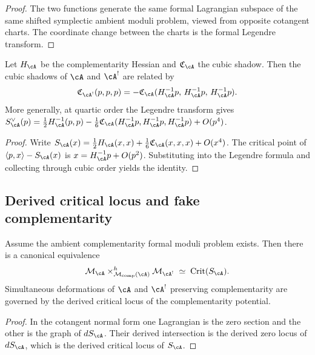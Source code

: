 \begin{proof}
The two functions generate the same formal Lagrangian subspace of
the same shifted symplectic ambient moduli problem, viewed from
opposite cotangent charts. The coordinate change between the charts
is the formal Legendre transform.
\end{proof}

\begin{proposition}
\label{prop:legendre-duality-cubic}
\ClaimStatusProvedHere
Let $H_{\cA}$ be the complementarity Hessian and
$\mathfrak{C}_{\cA}$ the cubic shadow. Then the cubic shadows
of $\cA$ and $\cA^!$ are related by
\[
\mathfrak{C}_{\cA^!}(p,p,p)
= -\mathfrak{C}_{\cA}(H_{\cA}^{-1}p,\, H_{\cA}^{-1}p,\,
H_{\cA}^{-1}p).
\]
More generally, at quartic order the Legendre transform gives
$S_{\cA}^\vee(p)
= \frac12 H_{\cA}^{-1}(p,p)
- \frac{1}{6}\mathfrak{C}_{\cA}
(H_{\cA}^{-1}p, H_{\cA}^{-1}p, H_{\cA}^{-1}p) + O(p^4)$.
\end{proposition}

\begin{proof}
Write $S_{\cA}(x) = \frac12 H_{\cA}(x,x)
+ \frac16 \mathfrak{C}_{\cA}(x,x,x) + O(x^4)$.
The critical point of $\langle p,x\rangle - S_{\cA}(x)$ is
$x = H_{\cA}^{-1}p + O(p^2)$. Substituting into the
Legendre formula and collecting through cubic order yields the
identity.
\end{proof}

\subsection{Derived critical locus and fake complementarity}
\label{subsec:derived-critical-locus}

\begin{theorem}
\label{thm:derived-critical-locus}
\ClaimStatusProvedHere
Assume the ambient complementarity formal moduli problem exists.
Then there is a canonical equivalence
\[
\mathcal{M}_{\cA}
\times^h_{\mathcal{M}_{\mathrm{comp}}(\cA)}
\mathcal{M}_{\cA^!}
\;\simeq\;
\operatorname{Crit}(S_{\cA}).
\]
Simultaneous deformations of $\cA$ and $\cA^!$ preserving
complementarity are governed by the derived critical locus of the
complementarity potential.
\end{theorem}

\begin{proof}
In the cotangent normal form one Lagrangian is the zero section and
the other is the graph of $dS_{\cA}$. Their derived intersection
is the derived zero locus of $dS_{\cA}$, which is the derived
critical locus of $S_{\cA}$.
\end{proof}

